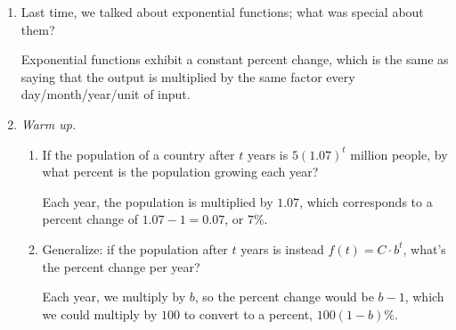 \documentclass{article}
\begin{document}
\begin{enumerate}
\item 


  \begin{problem}[\vfill]
    Last time, we talked about exponential functions; what was special
    about them?
  \end{problem}

  \begin{solution}
    Exponential functions exhibit a constant percent change, which is
    the same as saying that the output is multiplied by the same factor
    every day/month/year/unit of input.
  \end{solution}

\item  

  \emph{Warm up.}

  \begin{enumerate}
  \item
    \begin{problem}[\vfill]
      If the population of a country after $t$ years is $5 (1.07)^t$ million people, by what percent is the population growing each year?
    \end{problem}

    \begin{solution}
      Each year, the population is multiplied by $1.07$, which corresponds to a 
      percent change of $1.07-1 = 0.07$, or $7\%$.
    \end{solution}

  \item \label{warmup-exponential-function-to-percent-change}


    \begin{problem}[\vfill\newpage]
      Generalize: if the population after $t$ years is instead $f(t) = C \cdot b^t$, what's the percent change per year? 
    \end{problem}

    \begin{solution}
      Each year, we multiply by $b$, so the percent change
      would be $b-1$, which we could multiply by $100$ to convert to a percent, $100(1-b) \%$.
    \end{solution}


\end{enumerate}
\end{enumerate}
\end{document}
